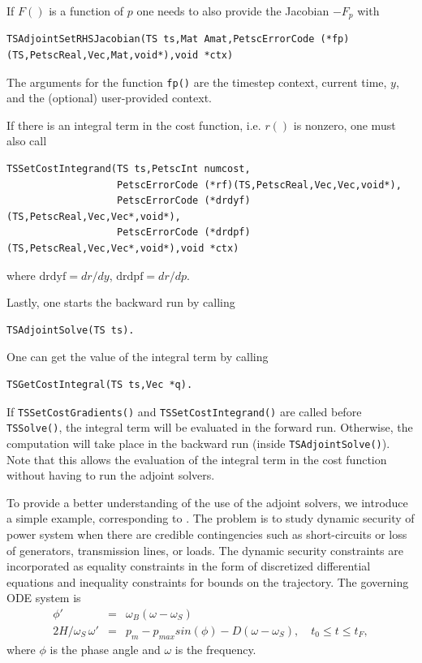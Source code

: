 If $F()$ is a function of $p$ one needs to also provide the Jacobian $-F_p$ with
\begin{lstlisting}
TSAdjointSetRHSJacobian(TS ts,Mat Amat,PetscErrorCode (*fp)(TS,PetscReal,Vec,Mat,void*),void *ctx)
\end{lstlisting}
The arguments for the function \lstinline{fp()}
are the timestep context, current time, $y$, and the (optional) user-provided context.

If there is an integral term in the cost function, i.e. $r()$ is nonzero, one must also call
\begin{lstlisting}
TSSetCostIntegrand(TS ts,PetscInt numcost,
                   PetscErrorCode (*rf)(TS,PetscReal,Vec,Vec,void*),
                   PetscErrorCode (*drdyf)(TS,PetscReal,Vec,Vec*,void*),
                   PetscErrorCode (*drdpf)(TS,PetscReal,Vec,Vec*,void*),void *ctx)
\end{lstlisting}
where $\mathrm{drdyf}= dr /dy$, $\mathrm{drdpf} = dr /dp$.

Lastly, one starts the backward run by calling
\begin{lstlisting}
TSAdjointSolve(TS ts).
\end{lstlisting}

One can get the value of the integral term by calling
\begin{lstlisting}
TSGetCostIntegral(TS ts,Vec *q).
\end{lstlisting}
If \lstinline{TSSetCostGradients()} and \lstinline{TSSetCostIntegrand()} are called before \lstinline{TSSolve()}, the integral term will be evaluated in the forward run.
Otherwise, the computation will take place in the backward run (inside \lstinline{TSAdjointSolve()}).
Note that this allows the evaluation of the integral term in the cost function without having to run the adjoint solvers.

To provide a better understanding of the use of the adjoint solvers, we introduce a simple example, corresponding to \href{http://www.mcs.anl.gov/petsc/petsc-current/src/ts/examples/tutorials/power_grid/ex3adj.c.html}{}.
The problem is to study dynamic security of power system when there are credible contingencies such as short-circuits or loss of generators, transmission lines, or loads.
The dynamic security constraints are incorporated as equality constraints in the form of discretized differential equations and inequality constraints for bounds on the trajectory.
The governing ODE system is
\begin{eqnarray*}
    \phi' &= &\omega_B (\omega - \omega_S)  \\
    2H/\omega_S \, \omega' & =& p_m - p_{max} sin(\phi) -D (\omega - \omega_S), \quad t_0 \leq t \leq t_F,
\end{eqnarray*}
where $\phi$ is the phase angle and $\omega$ is the frequency.

